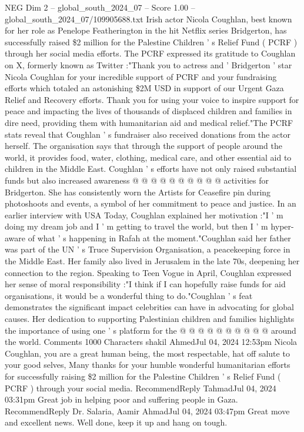 \begin{textsample}{NEG Dim 2 – global\_south\_2024\_07 – Score 1.00 – global\_south\_2024\_07/109905688.txt}  \label{ex:f2_neg_382}
Irish actor Nicola Coughlan, best known for her role as Penelope Featherington in the hit Netflix series Bridgerton, has successfully raised \$2 million for the Palestine Children ' s Relief Fund ( PCRF ) through her social media efforts.
The PCRF expressed its gratitude to Coughlan on X, formerly known as Twitter :"Thank you to actress and ' Bridgerton ' star Nicola Coughlan for your incredible support of PCRF and your fundraising efforts which totaled an astonishing \$2M USD in support of our Urgent Gaza Relief and Recovery efforts.
Thank you for using your voice to inspire support for peace and impacting the lives of thousands of displaced children and families in dire need, providing them with humanitarian aid and medical relief."The PCRF stats reveal that Coughlan ' s fundraiser also received donations from the actor herself.
The organisation says that through the support of people around the world, it provides food, water, clothing, medical care, and other essential aid to children in the Middle East.
Coughlan ' s efforts have not only raised substantial funds but also increased awareness @ @ @ @ @ @ @ @ @ @ activities for Bridgerton.
She has consistently worn the Artists for Ceasefire pin during photoshoots and events, a symbol of her commitment to peace and justice.
In an earlier interview with USA Today, Coughlan explained her motivation :"I ' m doing my dream job and I ' m getting to travel the world, but then I ' m hyper-aware of what ' s happening in Rafah at the moment."Coughlan said her father was part of the UN ' s Truce Supervision Organisation, a peacekeeping force in the Middle East.
Her family also lived in Jerusalem in the late 70s, deepening her connection to the region.
Speaking to Teen Vogue in April, Coughlan expressed her sense of moral responsibility :"I think if I can hopefully raise funds for aid organisations, it would be a wonderful thing to do."Coughlan ' s feat demonstrates the significant impact celebrities can have in advocating for global causes.
Her dedication to supporting Palestinian children and families highlights the importance of using one ' s platform for the @ @ @ @ @ @ @ @ @ @ around the world.
Comments 1000 Characters shakil AhmedJul 04, 2024 12:53pm Nicola Coughlan, you are a great human being, the most respectable, hat off salute to your good selves, Many thanks for your humble wonderful humanitarian efforts for successfully raising \$2 million for the Palestine Children ' s Relief Fund ( PCRF ) through your social media.
RecommendReply TahmadJul 04, 2024 03:31pm Great job in helping poor and suffering people in Gaza.
RecommendReply Dr.
Salaria, Aamir AhmadJul 04, 2024 03:47pm Great move and excellent news.
Well done, keep it up and hang on tough.

\end{textsample}
